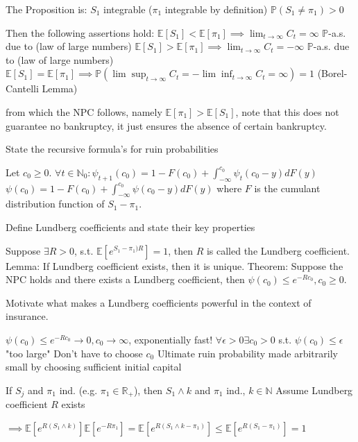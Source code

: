 \documentclass[11pt,a4paper,twoside]{article}
\begin{document}
The Proposition is:
\(S_1\) integrable (\(\pi_1\) integrable by definition)
\(\mathbb{P}(S_1 \ne \pi_1) > 0\)

Then the following assertions hold:
\(\mathbb{E}[S_1] < \mathbb{E}[\pi_1] \implies \lim_{t \rightarrow \infty} C_t = \infty\) \(\mathbb{P}\)-a.s. 
due to (law of large numbers)
\(\mathbb{E}[S_1] > \mathbb{E}[\pi_1] \implies \lim_{t \rightarrow \infty} C_t = -\infty\) \(\mathbb{P}\)-a.s. 
due to (law of large numbers)
\(\mathbb{E}[S_1] = \mathbb{E}[\pi_1] \implies \mathbb{P}(\lim \sup_{t \rightarrow \infty} C_t = -\lim \inf_{t \rightarrow \infty} C_t = \infty) = 1\) 
(Borel-Cantelli Lemma)

from which the NPC follows, namely
\( \mathbb{E}[\pi_1] > \mathbb{E}[S_1] \),
note that this does not guarantee no bankruptcy, it just ensures the absence of certain bankruptcy.


State the recursive formula's for ruin probabilities

Let \(c_0 \ge 0\).
\(\forall t \in \mathbb{N}_0: \psi_{t + 1}(c_0) = 1 - F(c_0) + \int_{-\infty}^{c_0} \psi_t(c_0 - y) dF(y)\)
\(\psi(c_0) = 1 - F(c_0) + \int_{-\infty}^{c_0} \psi(c_0 - y)dF(y)\)
where \( F \) is the cumulant distribution function of \( S_1 - \pi_1 \).


Define Lundberg coefficients and state their key properties

Suppose \( \exists R > 0 \), s.t. \( \mathbb{E}[e^{S_1 - \pi_1)R}] = 1 \),
then \( R \) is called the Lundberg coefficient.
Lemma:
If Lundberg coefficient exists, then it is unique.
Theorem:
Suppose the NPC holds and there exists a Lundberg coefficient, then \( \psi(c_0) \leq e^{-Rc_0}, c_0 \geq 0 \).


Motivate what makes a Lundberg coefficients powerful in the context of insurance.

\(\psi(c_0) \le e^{-R c_0} \rightarrow 0, c_0 \rightarrow \infty\), exponentially fast!
\(\forall \epsilon > 0 \exists c_0 > 0\) s.t. \(\psi(c_0) \le \epsilon\) "too large"
Don't have to choose \(c_0\)
Ultimate ruin probability made arbitrarily small by choosing sufficient initial capital

If \(S_j\) and \(\pi_1\) ind. (e.g. \(\pi_1 \in \mathbb{R}_+\)), then \(S_1 \wedge k\) and \(\pi_1\) ind., \(k \in \mathbb{N}\)
Assume Lundberg coefficient \(R\) exists

\(\implies \mathbb{E}[e^{R(S_1 \wedge k)}] \mathbb{E}[e^{-R \pi_1}] = \mathbb{E}[e^{R(S_1 \wedge k - \pi_1)}] \le \mathbb{E}[e^{R(S_1 - \pi_1)}] = 1\)
\end{document}
